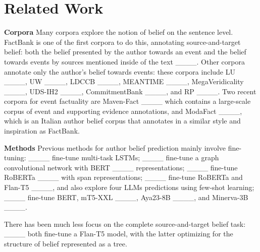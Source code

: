 \section{Related Work}
\label{sec:relwork}
\noindent\textbf{Corpora } Many corpora explore the notion of belief on the sentence level. FactBank is one of the first corpora to do this, annotating source-and-target belief: both the belief presented by the author towards an event and the belief towards events by sources mentioned inside of the text ____.
Other corpora annotate only the author's belief towards events: these corpora include LU ____, UW ____, LDCCB ____, MEANTIME ____, MegaVeridicality ____,  UDS-IH2 ____, CommitmentBank ____, and RP ____. Two recent corpora for event factuality are Maven-Fact ____ which contains a large-scale corpus of event and supporting evidence annotations, 
and ModaFact ____, which is an Italian author belief corpus that annotates in a similar style and inspiration as FactBank. 

\noindent\textbf{Methods} Previous methods for author belief prediction mainly involve fine-tuning: ____ fine-tune multi-task LSTMs; ____ fine-tune a graph convolutional network with BERT ____ representations; ____ fine-tune RoBERTa ____ with span representations; ____ fine-tune RoBERTa and Flan-T5 ____, and also explore four LLMs predictions using few-shot learning; ____ fine-tune BERT, mT5-XXL ____, Aya23-8B ____, and Minerva-3B ____.

There has been much less focus on the complete source-and-target belief task: ____ both fine-tune a Flan-T5 model, with the latter optimizing for the structure of belief represented as a tree.